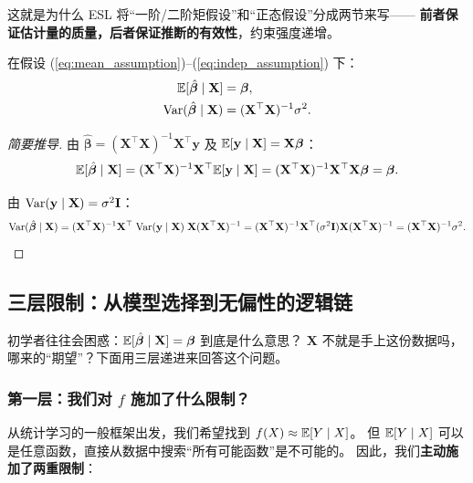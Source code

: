 这就是为什么 ESL 将``一阶/二阶矩假设''和``正态假设''分成两节来写——
\textbf{前者保证估计量的质量，后者保证推断的有效性}，约束强度递增。

\begin{theorem}
在假设 (\ref{eq:mean_assumption})--(\ref{eq:indep_assumption}) 下：
\begin{align}
    \mathbb{E}[\hat{\bm{\beta}} \mid \mathbf{X}] &= \bm{\beta}, \label{eq:beta_unbiased} \\
    \mathrm{Var}(\hat{\bm{\beta}} \mid \mathbf{X}) &= (\mathbf{X}^\top \mathbf{X})^{-1} \sigma^2. \label{eq:beta_var}
\end{align}
\end{theorem}

\begin{proof}[简要推导]
由 $\hat{\bm{\beta}} = (\mathbf{X}^\top \mathbf{X})^{-1} \mathbf{X}^\top \mathbf{y}$ 及 $\mathbb{E}[\mathbf{y} \mid \mathbf{X}] = \mathbf{X}\bm{\beta}$：
\[
    \mathbb{E}[\hat{\bm{\beta}} \mid \mathbf{X}]
    = (\mathbf{X}^\top \mathbf{X})^{-1} \mathbf{X}^\top \mathbb{E}[\mathbf{y} \mid \mathbf{X}]
    = (\mathbf{X}^\top \mathbf{X})^{-1} \mathbf{X}^\top \mathbf{X} \bm{\beta}
    = \bm{\beta}.
\]

由 $\mathrm{Var}(\mathbf{y} \mid \mathbf{X}) = \sigma^2 \mathbf{I}$：
\[
    \mathrm{Var}(\hat{\bm{\beta}} \mid \mathbf{X})
    = (\mathbf{X}^\top \mathbf{X})^{-1} \mathbf{X}^\top \;
      \mathrm{Var}(\mathbf{y} \mid \mathbf{X}) \;
      \mathbf{X} (\mathbf{X}^\top \mathbf{X})^{-1}
    = (\mathbf{X}^\top \mathbf{X})^{-1} \mathbf{X}^\top (\sigma^2 \mathbf{I}) \mathbf{X} (\mathbf{X}^\top \mathbf{X})^{-1}
    = (\mathbf{X}^\top \mathbf{X})^{-1} \sigma^2.
\]
\end{proof}

\subsection{三层限制：从模型选择到无偏性的逻辑链}

初学者往往会困惑：$\mathbb{E}[\hat{\bm{\beta}} \mid \mathbf{X}] = \bm{\beta}$ 到底是什么意思？
$\mathbf{X}$ 不就是手上这份数据吗，哪来的``期望''？下面用三层递进来回答这个问题。

\subsubsection{第一层：我们对 $f$ 施加了什么限制？}

从统计学习的一般框架出发，我们希望找到 $f(X) \approx \mathbb{E}[Y \mid X]$。
但 $\mathbb{E}[Y \mid X]$ 可以是任意函数，直接从数据中搜索``所有可能函数''是不可能的。
因此，我们\textbf{主动施加了两重限制}：

